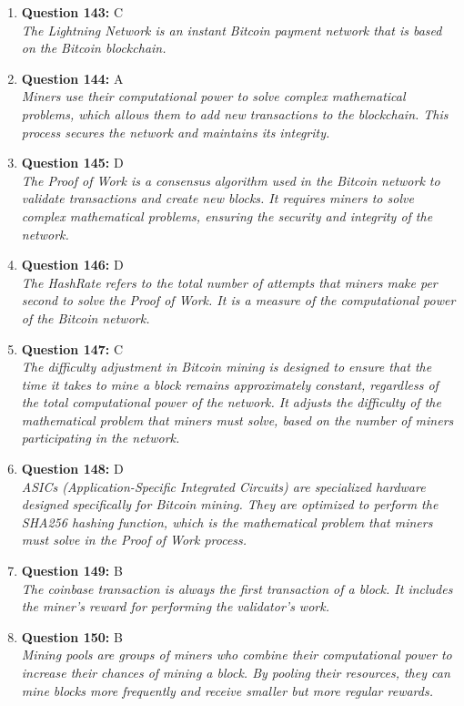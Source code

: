 \documentclass[12pt,a4paper]{article}
\begin{document}
\begin{enumerate}
\item \textbf{Question 143:} C
\\ \textit{The Lightning Network is an instant Bitcoin payment network that is based on the Bitcoin blockchain.}

\item \textbf{Question 144:} A
\\ \textit{Miners use their computational power to solve complex mathematical problems, which allows them to add new transactions to the blockchain. This process secures the network and maintains its integrity.}

\item \textbf{Question 145:} D
\\ \textit{The Proof of Work is a consensus algorithm used in the Bitcoin network to validate transactions and create new blocks. It requires miners to solve complex mathematical problems, ensuring the security and integrity of the network.}

\item \textbf{Question 146:} D
\\ \textit{The HashRate refers to the total number of attempts that miners make per second to solve the Proof of Work. It is a measure of the computational power of the Bitcoin network.}

\item \textbf{Question 147:} C
\\ \textit{The difficulty adjustment in Bitcoin mining is designed to ensure that the time it takes to mine a block remains approximately constant, regardless of the total computational power of the network. It adjusts the difficulty of the mathematical problem that miners must solve, based on the number of miners participating in the network.}

\item \textbf{Question 148:} D
\\ \textit{ASICs (Application-Specific Integrated Circuits) are specialized hardware designed specifically for Bitcoin mining. They are optimized to perform the SHA256 hashing function, which is the mathematical problem that miners must solve in the Proof of Work process.}

\item \textbf{Question 149:} B
\\ \textit{The coinbase transaction is always the first transaction of a block. It includes the miner's reward for performing the validator's work.}

\item \textbf{Question 150:} B
\\ \textit{Mining pools are groups of miners who combine their computational power to increase their chances of mining a block. By pooling their resources, they can mine blocks more frequently and receive smaller but more regular rewards.}


\end{enumerate}
\end{document}
